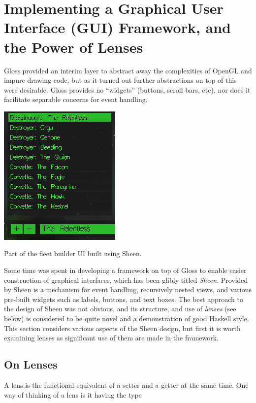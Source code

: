\section{Implementing a Graphical User Interface (GUI) Framework, and the Power of Lenses}
\label{sec:gui}

Gloss provided an interim layer to abstract away the complexities of OpenGL and impure drawing code, but as it turned out further abstractions on top of this were desirable. Gloss provides no ``widgets'' (buttons, scroll bars, etc), nor does it facilitate separable concerns for event handling.

\begin{marginfigure}
	\includegraphics{res/sheen/fleetbuilder1.png}
	\caption[Fleet builder UI built using Sheen]{Part of the fleet builder UI built using Sheen.}
	\label{fig:openglbasicout}
\end{marginfigure}

Some time was spent in developing a framework on top of Gloss to enable easier construction of graphical interfaces, which has been glibly titled \emph{Sheen}. Provided by Sheen is a mechanism for event handling, recursively nested views, and various pre-built widgets such as labels, buttons, and text boxes. The best approach to the design of Sheen was not obvious, and its structure, and use of \emph{lenses} (see below) is considered to be quite novel and a demonstration of good Haskell style. This section considers various aspects of the Sheen design, but first it is worth examining lenses as significant use of them are made in the framework.

\subsection{On Lenses}

A lens is the functional equivalent of a setter and a getter at the same time. One way of thinking of a lens is it having the type

